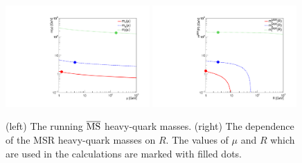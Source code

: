 \documentclass[12pt,a4paper]{article}
\newcommand{\msbar}{\ensuremath{\overline{\rm MS}}\xspace}
\begin{document}
\begin{figure}
    \centering
    \includegraphics[width=0.49\textwidth]{figs/mcmbmtrun.pdf}
    \includegraphics[width=0.49\textwidth]{figs/mcmbmtrun-msr.pdf}
    \caption{(left) The running \msbar heavy-quark masses. (right) The dependence of the MSR heavy-quark masses on $R$. The values of $\mu$ and $R$ which are used in the calculations are marked with filled dots.}
    \label{fig:mcmbmtrun}
\end{figure}
\end{document}
